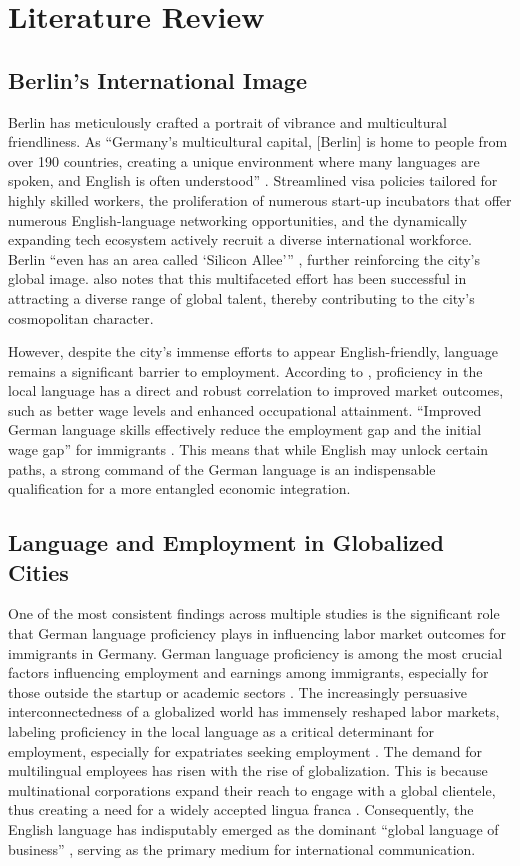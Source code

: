 \chapter{Literature Review}
\vspace{9pt}
\section{Berlin’s International Image}
Berlin has meticulously crafted a portrait of vibrance and multicultural friendliness. As “Germany’s multicultural capital, [Berlin] is home to people from over 190 countries, creating a unique environment where many languages are spoken, and English is often understood” \citep{kummuni25Language}. Streamlined visa policies tailored for highly skilled workers, the proliferation of numerous start-up incubators that offer numerous English-language networking opportunities, and the dynamically expanding tech ecosystem actively recruit a diverse international workforce. Berlin “even has an area called ‘Silicon Allee’” \citep{simplegermany25}, further reinforcing the city’s global image. \citet{bertelsmann} also notes that this multifaceted effort has been successful in attracting a diverse range of global talent, thereby contributing to the city’s cosmopolitan character.

However, despite the city’s immense efforts to appear English-friendly, language remains a significant barrier to employment. According to \citet{berbee24Mig}, proficiency in the local language has a direct and robust correlation to improved market outcomes, such as better wage levels and enhanced occupational attainment. “Improved German language skills effectively reduce the employment gap and the initial wage gap” for immigrants \citep{berbee24Mig}. This means that while English may unlock certain paths, a strong command of the German language is an indispensable qualification for a more entangled economic integration.


\section{Language and Employment in Globalized Cities}
One of the most consistent findings across multiple studies is the significant role that German language proficiency plays in influencing labor market outcomes for immigrants in Germany. German language proficiency is among the most crucial factors influencing employment and earnings among immigrants, especially for those outside the startup or academic sectors \citep{berbee24Mig}. The increasingly persuasive interconnectedness of a globalized world has immensely reshaped labor markets, labeling proficiency in the local language as a critical determinant for employment, especially for expatriates seeking employment \citep{Shohamy06}. The demand for multilingual employees has risen with the rise of globalization. This is because multinational corporations expand their reach to engage with a global clientele, thus creating a need for a widely accepted lingua franca \citep{LinguaFranca}. Consequently, the English language has indisputably emerged as the dominant “global language of business” \citep{Neeley2012}, serving as the primary medium for international communication.


